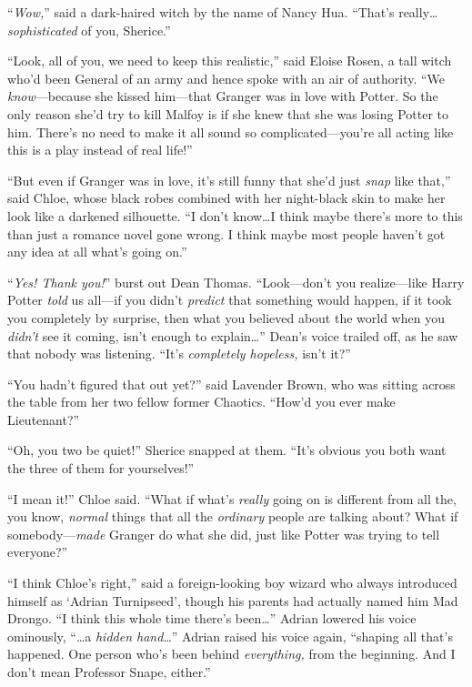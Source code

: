 “\emph{Wow,}” said a dark-haired witch by the name of Nancy Hua. “That’s really…\emph{sophisticated} of you, Sherice.”

“Look, all of you, we need to keep this realistic,” said Eloise Rosen, a tall witch who’d been General of an army and hence spoke with an air of authority. “We \emph{know}—because she kissed him—that Granger was in love with Potter. So the only reason she’d try to kill Malfoy is if she knew that she was losing Potter to him. There’s no need to make it all sound so complicated—you’re all acting like this is a play instead of real life!”

“But even if Granger was in love, it’s still funny that she’d just \emph{snap} like that,” said Chloe, whose black robes combined with her night-black skin to make her look like a darkened silhouette. “I don’t know…I think maybe there’s more to this than just a romance novel gone wrong. I think maybe most people haven’t got any idea at all what’s going on.”

“\emph{Yes! Thank you!}” burst out Dean Thomas. “Look—don’t you realize—like Harry Potter \emph{told} us all—if you didn’t \emph{predict} that something would happen, if it took you completely by surprise, then what you believed about the world when you \emph{didn’t} see it coming, isn’t enough to explain…” Dean’s voice trailed off, as he saw that nobody was listening. “It’s \emph{completely hopeless,} isn’t it?”

“You hadn’t figured that out yet?” said Lavender Brown, who was sitting across the table from her two fellow former Chaotics. “How’d you ever make Lieutenant?”

“Oh, you two be quiet!” Sherice snapped at them. “It’s obvious you both want the three of them for yourselves!”

“I mean it!” Chloe said. “What if what’s \emph{really} going on is different from all the, you know, \emph{normal} things that all the \emph{ordinary} people are talking about? What if somebody—\emph{made} Granger do what she did, just like Potter was trying to tell everyone?”

“I think Chloe’s right,” said a foreign-looking boy wizard who always introduced himself as ‘Adrian Turnipseed’, though his parents had actually named him Mad Drongo. “I think this whole time there’s been…” Adrian lowered his voice ominously, “…a \emph{hidden hand}…” Adrian raised his voice again, “shaping all that’s happened. One person who’s been behind \emph{everything,} from the beginning. And I don’t mean Professor Snape, either.”

